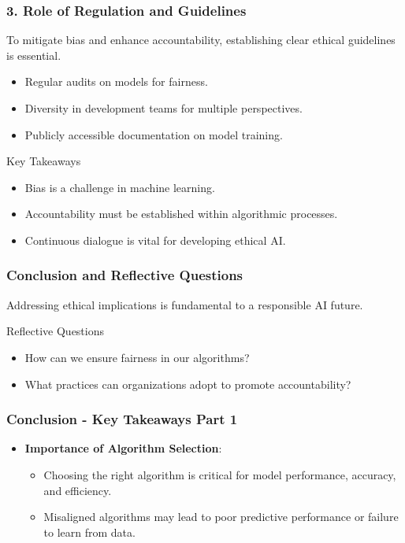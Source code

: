 \documentclass[aspectratio=169]{beamer}
\begin{document}
\begin{frame}[fragile]
    \frametitle{3. Role of Regulation and Guidelines}
    To mitigate bias and enhance accountability, establishing clear ethical guidelines is essential.

    \begin{itemize}
        \item Regular audits on models for fairness.
        \item Diversity in development teams for multiple perspectives.
        \item Publicly accessible documentation on model training.
    \end{itemize}
    
    \begin{block}{Key Takeaways}
        \begin{itemize}
            \item Bias is a challenge in machine learning.
            \item Accountability must be established within algorithmic processes.
            \item Continuous dialogue is vital for developing ethical AI.
        \end{itemize}
    \end{block}
\end{frame}

\begin{frame}[fragile]
    \frametitle{Conclusion and Reflective Questions}
    Addressing ethical implications is fundamental to a responsible AI future.

    \begin{block}{Reflective Questions}
        \begin{itemize}
            \item How can we ensure fairness in our algorithms?
            \item What practices can organizations adopt to promote accountability?
        \end{itemize}
    \end{block}
\end{frame}

\begin{frame}[fragile]
    \frametitle{Conclusion - Key Takeaways Part 1}
    \begin{itemize}
        \item \textbf{Importance of Algorithm Selection}:
        \begin{itemize}
            \item Choosing the right algorithm is critical for model performance, accuracy, and efficiency.
            \item Misaligned algorithms may lead to poor predictive performance or failure to learn from data.
        \end{itemize}
    \end{itemize}
\end{frame}
\end{document}
